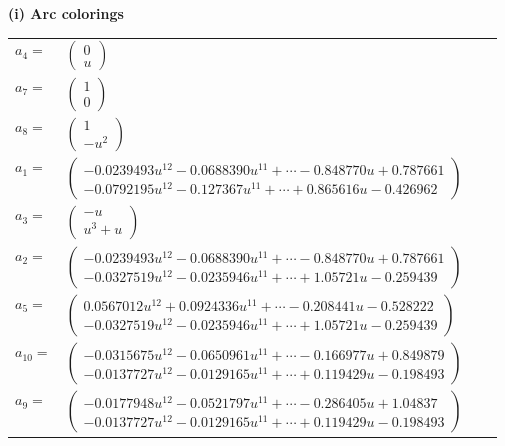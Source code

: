 \documentclass[1p]{elsarticle_modified}
\theoremstyle{definition}
\begin{document}
\flushleft \textbf{(i) Arc colorings}\\
\begin{tabular}{m{7pt} m{180pt} m{7pt} m{180pt} }
\flushright $a_{4}=$&$\begin{pmatrix}0\\u\end{pmatrix}$ \\
\flushright $a_{7}=$&$\begin{pmatrix}1\\0\end{pmatrix}$ \\
\flushright $a_{8}=$&$\begin{pmatrix}1\\- u^2\end{pmatrix}$ \\
\flushright $a_{1}=$&$\begin{pmatrix}-0.0239493 u^{12}-0.0688390 u^{11}+\cdots-0.848770 u+0.787661\\-0.0792195 u^{12}-0.127367 u^{11}+\cdots+0.865616 u-0.426962\end{pmatrix}$ \\
\flushright $a_{3}=$&$\begin{pmatrix}- u\\u^3+u\end{pmatrix}$ \\
\flushright $a_{2}=$&$\begin{pmatrix}-0.0239493 u^{12}-0.0688390 u^{11}+\cdots-0.848770 u+0.787661\\-0.0327519 u^{12}-0.0235946 u^{11}+\cdots+1.05721 u-0.259439\end{pmatrix}$ \\
\flushright $a_{5}=$&$\begin{pmatrix}0.0567012 u^{12}+0.0924336 u^{11}+\cdots-0.208441 u-0.528222\\-0.0327519 u^{12}-0.0235946 u^{11}+\cdots+1.05721 u-0.259439\end{pmatrix}$ \\
\flushright $a_{10}=$&$\begin{pmatrix}-0.0315675 u^{12}-0.0650961 u^{11}+\cdots-0.166977 u+0.849879\\-0.0137727 u^{12}-0.0129165 u^{11}+\cdots+0.119429 u-0.198493\end{pmatrix}$ \\
\flushright $a_{9}=$&$\begin{pmatrix}-0.0177948 u^{12}-0.0521797 u^{11}+\cdots-0.286405 u+1.04837\\-0.0137727 u^{12}-0.0129165 u^{11}+\cdots+0.119429 u-0.198493\end{pmatrix}$ \\

\end{tabular}
\end{document}
